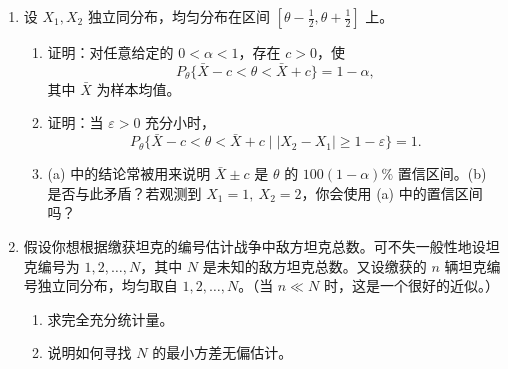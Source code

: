 \documentclass[UTF8,12pt]{ctexart}
\begin{document}
\begin{enumerate}[label=\textbf{\arabic*.},leftmargin=2.2em]
\item 设 \(X_1,X_2\) 独立同分布，均匀分布在区间 \([\theta-\frac12,\theta+\frac12]\) 上。
\begin{enumerate}[label=\textbf{(\alph*)},leftmargin=2.4em]
\item 证明：对任意给定的 \(0<\alpha<1\)，存在 \(c>0\)，使
\[
P_\theta\{\bar X-c<\theta<\bar X+c\}=1-\alpha,
\]
其中 \(\bar X\) 为样本均值。
\item 证明：当 \(\varepsilon>0\) 充分小时，
\[
P_\theta\{\bar X-c<\theta<\bar X+c\mid |X_2-X_1|\ge1-\varepsilon\}=1.
\]
\item (a) 中的结论常被用来说明 \(\bar X\pm c\) 是 \(\theta\) 的 \(100(1-\alpha)\%\) 置信区间。(b) 是否与此矛盾？若观测到 \(X_1=1,\ X_2=2\)，你会使用 (a) 中的置信区间吗？
\end{enumerate}

\item 假设你想根据缴获坦克的编号估计战争中敌方坦克总数。可不失一般性地设坦克编号为 \(1,2,\ldots,N\)，其中 \(N\) 是未知的敌方坦克总数。又设缴获的 \(n\) 辆坦克编号独立同分布，均匀取自 \(1,2,\ldots,N\)。（当 \(n\ll N\) 时，这是一个很好的近似。）
\begin{enumerate}[label=\textbf{(\alph*)},leftmargin=2.4em]
\item 求完全充分统计量。
\item 说明如何寻找 \(N\) 的最小方差无偏估计。
\end{enumerate}
\end{enumerate}
\end{document}
